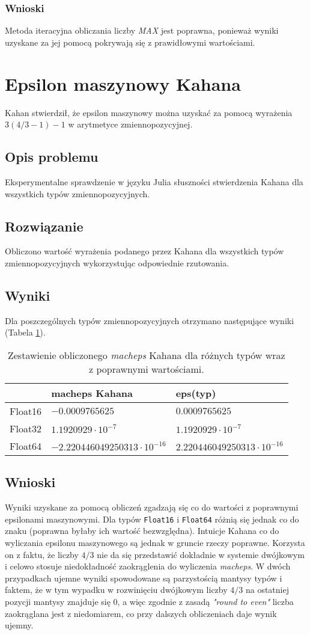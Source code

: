 \documentclass[11pt,a4paper]{article}
\begin{document}
\subsubsection{Wnioski}
Metoda iteracyjna obliczania liczby \emph{MAX} jest poprawna, ponieważ wyniki uzyskane za jej pomocą pokrywają się z prawidłowymi wartościami.

\section{Epsilon maszynowy Kahana}
Kahan stwierdził, że epsilon maszynowy można uzyskać za pomocą wyrażenia $3(4/{3}-1)-1$ w arytmetyce zmiennopozycyjnej.
\subsection{Opis problemu}
Eksperymentalne sprawdzenie w języku Julia słuszności stwierdzenia Kahana dla wszystkich typów zmiennopozycyjnych.
\subsection{Rozwiązanie}
Obliczono wartość wyrażenia podanego przez Kahana dla wszystkich typów zmiennopozycyjnych wykorzystując odpowiednie rzutowania.
\subsection{Wyniki}
Dla poszczególnych typów zmiennopozycyjnych otrzymano następujące wyniki (Tabela \ref{table:4}).
\begin{table}[!h]
\centering
\begin{tabular}{l | l | l}
& macheps Kahana & eps(typ) \\ \hline
Float16 & $-0.0009765625$ & $0.0009765625$ \\
Float32 & $1.1920929\cdot 10^{-7}$ & $1.1920929\cdot 10^{-7}$ \\
Float64 & $-2.220446049250313\cdot 10^{-16}$ & $2.220446049250313\cdot 10^{-16}$ \\
\end{tabular}
\caption{\label{table:4}Zestawienie obliczonego \emph{macheps} Kahana dla różnych typów wraz z poprawnymi wartościami.}
\end{table}
\subsection{Wnioski}
Wyniki uzyskane za pomocą obliczeń zgadzają się co do wartości z poprawnymi epsilonami maszynowymi. Dla typów \texttt{Float16} i \texttt{Float64} różnią się jednak co do znaku (poprawna byłaby ich wartość bezwzględna). Intuicje Kahana co do wyliczania epsilonu maszynowego są jednak w gruncie rzeczy poprawne. Korzysta on z faktu, że liczby $4/{3}$ nie da się przedstawić dokładnie w systemie dwójkowym i celowo stosuje niedokładność zaokrąglenia do wyliczenia \emph{macheps}. W dwóch przypadkach ujemne wyniki spowodowane są parzystością mantysy typów i faktem, że w tym wypadku w rozwinięciu dwójkowym liczby $4/{3}$ na ostatniej pozycji mantysy znajduje się $0$, a więc zgodnie z zasadą \textit{"round to even"} liczba zaokrąglana jest z niedomiarem, co przy dalszych obliczeniach daje wynik ujemny.
\end{document}
